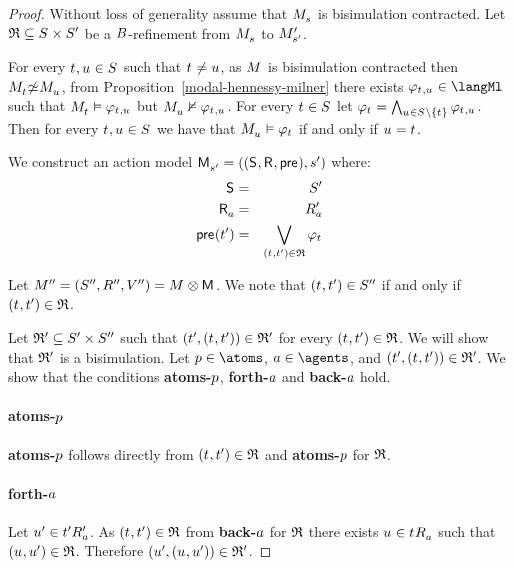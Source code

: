 \begin{proof}
Without loss of generality assume that $\kPModel{\kStateS}$ is bisimulation contracted.
Let $\refinement \subseteq \kStates \times \kStatesP$ be a $B$-refinement from $\kPModel{\kStateS}$ to ${M^{\prime}_{{s}^{\prime}}}$.

For every $\kStateT, \kStateU \in \kStates$ such that $\kStateT \neq \kStateU$, as $\kModel$ is bisimulation contracted then $\kPModel{\kStateT} \nbisimilar \kPModel{\kStateU}$, from Proposition~\ref{modal-hennessy-milner} there exists $\phi_{\kStateT, \kStateU} \in \langMl$ such that $\kPModel{\kStateT} \entails \phi_{\kStateT, \kStateU}$ but $\kPModel{\kStateU} \nentails \phi_{\kStateT, \kStateU}$.
For every $\kStateT \in \kStates$ let $\phi_{\kStateT} = \bigwedge_{\kStateU \in \kStates \setminus \{\kStateT\}} \phi_{\kStateT, \kStateU}$.
Then for every $\kStateT, \kStateU \in \kStates$ we have that $\kPModel{\kStateU} \entails \phi_{\kStateT}$ if and only if $\kStateU = \kStateT$.

We construct an action model $\aPModelAndTuple{\kStateSP}$ where:
\begin{eqnarray*}
    \aStates &=& \kStatesP\\
    \aAccessibilityA &=& \kAccessibilityPA\\
    \aPrecondition(\kStateTP) &=& \bigvee_{(\kStateT, \kStateTP) \in \refinement} \phi_{\kStateT}
\end{eqnarray*}

Let $\kModelAndTuplePP = \kModel \exec \aModel$. 
We note that $(\kStateT, \kStateTP) \in \kStatesPP$ if and only if $(\kStateT, \kStateTP) \in \refinement$.

Let $\mathfrak{R}' \subseteq {S^{\prime}} \times {S^{\prime\prime}}$ such that $(\kStateTP, (\kStateT, \kStateTP)) \in \bisimulation' $ for every $(\kStateT, \kStateTP) \in \refinement$.
We will show that $\mathfrak{R}'$ is a bisimulation.
Let $\atomP \in \atoms$, $\agentA \in \agents$, and $(\kStateTP, (\kStateT, \kStateTP)) \in \bisimulation'$.
We show that the conditions {\bf atoms-$p$}, {\bf forth-$a$} and {\bf back-$a$} hold.

\paragraph{atoms-$p$}
{\bf atoms-$p$} follows directly from $(\kStateT, \kStateTP) \in \refinement$ and {\bf atoms-$p$} for $\mathfrak{R}$.

\paragraph{forth-$a$}
Let ${u}^{\prime} \in {{t}^{\prime}} {R^{\prime}_{a}}$.
As $(\kStateT, \kStateTP) \in \refinement$ from {\bf back-$a$} for $\mathfrak{R}$ there exists $\kStateU \in \kSuccessorsA{\kStateT}$ such that $(\kStateU, \kStateUP) \in \refinement$.
Therefore $(\kStateUP, (\kStateU, \kStateUP)) \in \bisimulation'$.


\end{proof}
